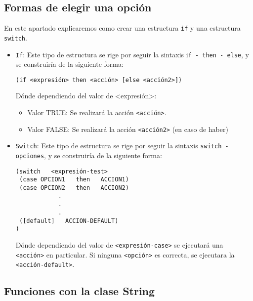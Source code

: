 \documentclass[11pt,svgnames]{scrbook}
\begin{document}
\subsection{Formas de elegir una opción}

En este apartado explicaremos como crear una estructura \texttt{if} y una estructura
 \texttt{switch}.
\begin{itemize}
 \item \texttt{If}: Este tipo de estructura se rige por seguir la sintaxis
i\texttt{f -
then - else}, y se construiría de la siguiente forma:

\texttt{(if    <expresión>     then     <acción>     [else    <acción2>])}

	Dónde dependiendo del valor de  <expresión>:

\begin{itemize}
\item Valor  TRUE: Se realizará la acción \texttt{<acción>}.
\item Valor FALSE: Se realizará la acción \texttt{<acción2>} (en caso de haber)
\end{itemize}

\item \texttt{Switch}: Este tipo de estructura se rige por seguir la sintaxis
\texttt{switch - opciones}, y se construiría de la siguiente forma:

\begin{verbatim}
(switch   <expresión-test>
 (case OPCION1   then   ACCION1)
 (case OPCION2   then   ACCION2)
            .
            .
            .
 ([default]   ACCION-DEFAULT)
)
\end{verbatim}

Dónde dependiendo del valor de \texttt{<expresión-case>} se ejecutará una  \texttt{<acción>} en particular. Si ninguna \texttt{<opción>} es correcta, se ejecutara la \texttt{<acción-default>}.
\end{itemize}



\subsection{Funciones con la clase String}
\end{document}

